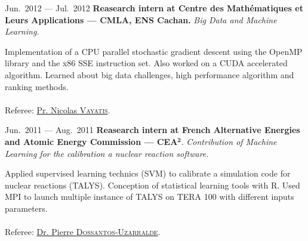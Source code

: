 \documentclass{tccv}
\begin{document}
\begin{eventlist}
\item{Jun.~2012 --- Jul.~2012}
     {\textbf{Reasearch intern at Centre des Math\'ematiques et Leurs
     Applications --- CMLA, ENS Cachan.}}
     {\large \textit{Big Data and Machine Learning.}}


Implementation of a CPU parallel stochastic gradient descent using the OpenMP
library and the x86 SSE instruction set. Also worked on a CUDA accelerated
algorithm. Learned about big data challenges, high performance algorithm and
ranking methods.
\vspace{-5mm}\paragraph{}
Referee: \href{http://nvayatis.perso.math.cnrs.fr/}{Pr. Nicolas
\textsc{Vayatis}}.



\item{Jun.~2011 --- Aug.~2011}
     {\textbf{Reasearch intern at French Alternative Energies and Atomic Energy
     Commission --- CEA}$\mathbf{{}^2}$.}
     {\textit{\large Contribution of Machine Learning for the calibration a
     nuclear reaction software.} }

Applied supervised learning technics (SVM) to calibrate a simulation code for
nuclear reactions (TALYS). Conception of statistical learning tools with R.
Used MPI to launch multiple instance of TALYS on TERA 100 with different inputs
parameters.

\vspace{-5mm}\paragraph{}
Referee: \href{mailto:pierre.dossantos-uzarralde@cea.fr}{Dr. Pierre
\textsc{Dossantos-Uzarralde}}.

\vspace{15cm}

\end{eventlist}
\end{document}
